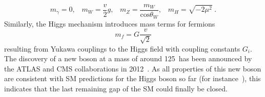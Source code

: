 \begin{description}
\begin{equation*}
m_{\gamma} = 0, \;\;\; m_W = \frac{v}{2}g, \;\;\; m_Z = \frac{m_W}{\mathrm{cos}\theta_{W}}, \;\;\; m_H = \sqrt{-2\mu^2} \;.
\end{equation*}
Similarly, the Higgs mechanism introduces mass terms for fermions 
\begin{equation*}
m_{f} = G \frac{v}{\sqrt{2}}
\end{equation*}
resulting from Yukawa couplings to the Higgs field with coupling constants $G_i$. \\
The discovery of a new boson at a mass of around 125~\gev has been announced by the ATLAS and CMS collaborations in 2012~\cite{Aad:2012tfa, Chatrchyan:2012ufa}. As all properties of this new boson are consistent with SM predictions for the Higgs boson so far (\cf for instance~\cite{Aad:2013wqa, Aad:2014eva, Aad:2014eha, CMS-PAS-HIG-14-009}), this indicates that the last remaining gap of the SM could finally be closed.   
\end{description}

